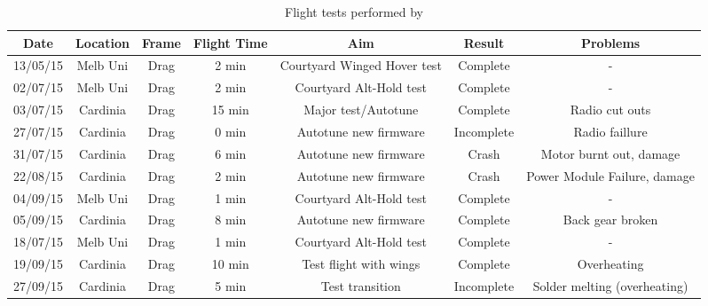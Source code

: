 



\label{sec:diary}
\begin{table}[htbp]
	\centering
	\caption{Flight tests performed by \ID}
	\begin{tabular}{|c|c|c|c|c|c|c|}
		\hline Date & Location & Frame & Flight Time & Aim & Result & Problems \\ 
		\hline 13/05/15 & Melb Uni & Drag & 2 min & Courtyard Winged Hover test & Complete & - \\ 
		\hline 02/07/15 & Melb Uni & Drag & 2 min & Courtyard Alt-Hold test & Complete & - \\ 
		\hline 03/07/15 & Cardinia & Drag & 15 min & Major test/Autotune & Complete & Radio cut outs \\ 
		\hline 27/07/15 & Cardinia  & Drag & 0 min & Autotune new firmware & Incomplete & Radio faillure \\ 
		\hline 31/07/15 & Cardinia  & Drag & 6 min & Autotune new firmware & Crash & Motor burnt out, damage  \\ 
		\hline 22/08/15 & Cardinia  & Drag & 2 min & Autotune new firmware & Crash & Power Module Failure, damage\\
		\hline 04/09/15 & Melb Uni & Drag & 1 min & Courtyard Alt-Hold test & Complete & - \\  
		\hline 05/09/15 & Cardinia  & Drag & 8 min & Autotune new firmware & Complete & Back gear broken\\
		\hline 18/07/15 & Melb Uni & Drag & 1 min & Courtyard Alt-Hold test & Complete & - \\  
		\hline 19/09/15 & Cardinia  & Drag & 10 min & Test flight with wings & Complete & Overheating \\ 
		\hline 27/09/15 & Cardinia  & Drag & 5 min & Test transition & Incomplete & Solder melting (overheating) \\ 
		\hline 
	\end{tabular} 
	\label{tab:tests}
\end{table}


